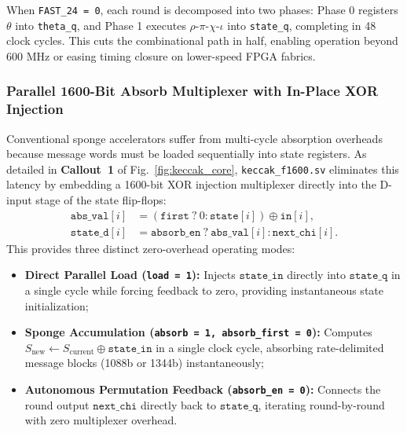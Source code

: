 When \texttt{FAST\_24 = 0}, each round is decomposed into two phases: Phase 0 registers $\theta$ into \texttt{theta\_q}, and Phase 1 executes $\rho$-$\pi$-$\chi$-$\iota$ into \texttt{state\_q}, completing in 48 clock cycles. This cuts the combinational path in half, enabling operation beyond $600\text{ MHz}$ or easing timing closure on lower-speed FPGA fabrics.

\subsubsection{Parallel 1600-Bit Absorb Multiplexer with In-Place XOR Injection}
Conventional sponge accelerators suffer from multi-cycle absorption overheads because message words must be loaded sequentially into state registers. As detailed in \textbf{Callout~1} of Fig.~\ref{fig:keccak_core}, \texttt{keccak\_f1600.sv} eliminates this latency by embedding a 1600-bit XOR injection multiplexer directly into the D-input stage of the state flip-flops:
\begin{align}
\texttt{abs\_val}[i] &= (\texttt{first} \ ? \ 0 : \texttt{state}[i]) \oplus \texttt{in}[i], \label{eq:absorb_val} \\
\texttt{state\_d}[i] &= \texttt{absorb\_en} \ ? \ \texttt{abs\_val}[i] : \texttt{next\_chi}[i]. \label{eq:state_d}
\end{align}
This provides three distinct zero-overhead operating modes:
\begin{itemize}
    \item \textbf{Direct Parallel Load (\texttt{load = 1}):} Injects $\texttt{state\_in}$ directly into $\texttt{state\_q}$ in a single cycle while forcing feedback to zero, providing instantaneous state initialization;
    \item \textbf{Sponge Accumulation (\texttt{absorb = 1, absorb\_first = 0}):} Computes $S_{\text{new}} \leftarrow S_{\text{current}} \oplus \texttt{state\_in}$ in a single clock cycle, absorbing rate-delimited message blocks (1088b or 1344b) instantaneously;
    \item \textbf{Autonomous Permutation Feedback (\texttt{absorb\_en = 0}):} Connects the round output $\texttt{next\_chi}$ directly back to $\texttt{state\_q}$, iterating round-by-round with zero multiplexer overhead.
\end{itemize}

